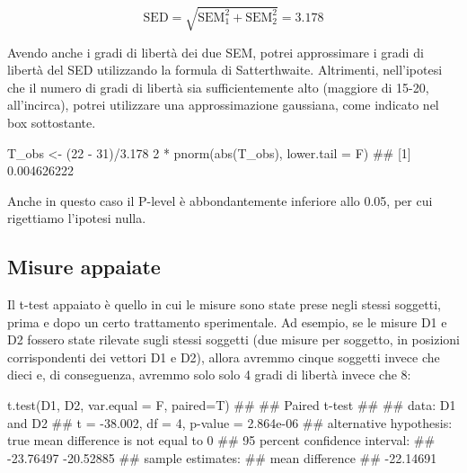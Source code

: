 \documentclass[a4paper,12pt,oneside]{book}
\newenvironment{Shaded}{\begin{snugshade}}{\end{snugshade}}
\newcommand{\DecValTok}[1]{#1}
\newcommand{\FloatTok}[1]{#1}
\newcommand{\SpecialCharTok}[1]{#1}
\newcommand{\DocumentationTok}[1]{#1}
\newcommand{\OtherTok}[1]{#1}
\newcommand{\FunctionTok}[1]{#1}
\newcommand{\AttributeTok}[1]{#1}
\newcommand{\NormalTok}[1]{#1}
\begin{document}
\[\textrm{SED} = \sqrt{\textrm{SEM}_1^2 + \textrm{SEM}_2^2} = 3.178\]

Avendo anche i gradi di libertà dei due SEM, potrei approssimare i gradi di libertà del SED utilizzando la formula di Satterthwaite. Altrimenti, nell'ipotesi che il numero di gradi di libertà sia sufficientemente alto (maggiore di 15-20, all'incirca), potrei utilizzare una approssimazione gaussiana, come indicato nel box sottostante.

\begin{Shaded}
\begin{Highlighting}[]
\NormalTok{T\_obs }\OtherTok{\textless{}{-}}\NormalTok{ (}\DecValTok{22} \SpecialCharTok{{-}} \DecValTok{31}\NormalTok{)}\SpecialCharTok{/}\FloatTok{3.178}
\DecValTok{2} \SpecialCharTok{*} \FunctionTok{pnorm}\NormalTok{(}\FunctionTok{abs}\NormalTok{(T\_obs), }\AttributeTok{lower.tail =}\NormalTok{ F)}
\DocumentationTok{\#\# [1] 0.004626222}
\end{Highlighting}
\end{Shaded}

Anche in questo caso il P-level è abbondantemente inferiore allo 0.05, per cui rigettiamo l'ipotesi nulla.

\hypertarget{misure-appaiate}{%
\subsection{Misure appaiate}\label{misure-appaiate}}

Il t-test appaiato è quello in cui le misure sono state prese negli stessi soggetti, prima e dopo un certo trattamento sperimentale. Ad esempio, se le misure D1 e D2 fossero state rilevate sugli stessi soggetti (due misure per soggetto, in posizioni corrispondenti dei vettori D1 e D2), allora avremmo cinque soggetti invece che dieci e, di conseguenza, avremmo solo solo 4 gradi di libertà invece che 8:

\begin{Shaded}
\begin{Highlighting}[]
\FunctionTok{t.test}\NormalTok{(D1, D2, }\AttributeTok{var.equal =}\NormalTok{ F, }\AttributeTok{paired=}\NormalTok{T)}
\DocumentationTok{\#\# }
\DocumentationTok{\#\#  Paired t{-}test}
\DocumentationTok{\#\# }
\DocumentationTok{\#\# data:  D1 and D2}
\DocumentationTok{\#\# t = {-}38.002, df = 4, p{-}value = 2.864e{-}06}
\DocumentationTok{\#\# alternative hypothesis: true mean difference is not equal to 0}
\DocumentationTok{\#\# 95 percent confidence interval:}
\DocumentationTok{\#\#  {-}23.76497 {-}20.52885}
\DocumentationTok{\#\# sample estimates:}
\DocumentationTok{\#\# mean difference }
\DocumentationTok{\#\#       {-}22.14691}
\end{Highlighting}
\end{Shaded}
\end{document}
